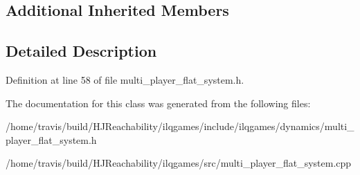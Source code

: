 \subsection*{Additional Inherited Members}


\subsection{Detailed Description}


Definition at line 58 of file multi\+\_\+player\+\_\+flat\+\_\+system.\+h.



The documentation for this class was generated from the following files\+:\begin{DoxyCompactItemize}
\item 
/home/travis/build/\+H\+J\+Reachability/ilqgames/include/ilqgames/dynamics/multi\+\_\+player\+\_\+flat\+\_\+system.\+h\item 
/home/travis/build/\+H\+J\+Reachability/ilqgames/src/multi\+\_\+player\+\_\+flat\+\_\+system.\+cpp\end{DoxyCompactItemize}
